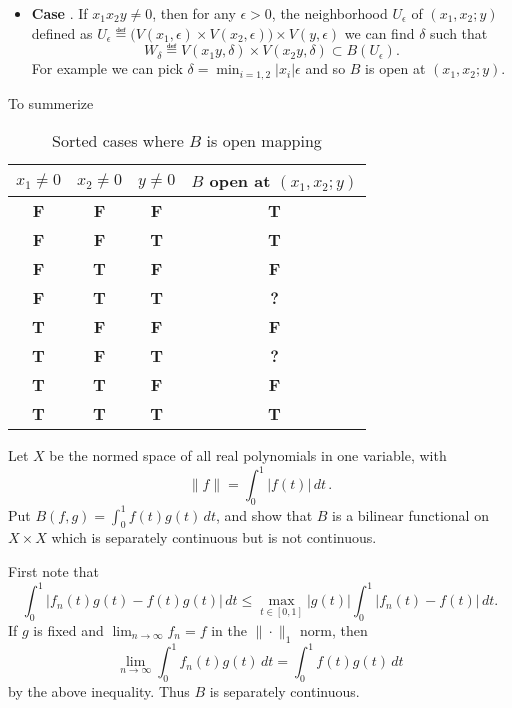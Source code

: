 \begin{enumerate}
\begin{itemize}
\item \textbf{Case} .
If \(x_1 x_2 y \neq 0\), then for any \(\epsilon>0\), 
the neighborhood \(U_\epsilon\) of
\((x_1,x_2;y)\) defined as 
\(U_\epsilon 
  \eqdef \bigl(V(x_1,\epsilon) \times  V(x_2,\epsilon)\bigr) 
         \times V(y,\epsilon)\)
we can find \(\delta\) such that 
\begin{equation*}
 W_\delta \eqdef V(x_1y,\delta) \times V(x_2y,\delta) \subset B(U_\epsilon).
\end{equation*}
For example we can pick
\(\delta = \min_{i=1,2} |x_i|\epsilon\)
and so $B$ is open at \((x_1,x_2;y)\).

\end{itemize}

To summerize
\begin{table}[ht] \label{tbl:B:open}
\begin{center}
\newcommand{\bfsf}{\bfseries\sffamily}
\begin{tabular}{|>{\bfsf}c|>{\bfsf}c|>{\bfsf}c|>{\bfseries}c|}
\hline
 \(x_1\neq 0\) &  \(x_2\neq 0\)  & \(y\neq 0\) & $B$ open at \((x_1,x_2;y)\) \\
\hline
  F & F & F & T \\ \hline
  F & F & T & T \\ \hline
  F & T & F & F \\ \hline
  F & T & T & ? \\ \hline
  T & F & F & F \\ \hline
  T & F & T & ? \\ \hline
  T & T & F & F \\ \hline
  T & T & T & T \\ \hline
\end{tabular}
\caption{Sorted cases where $B$ is open mapping}
\end{center}
\end{table}


\begin{excopy}
Let $X$ be the normed space of all real polynomials in one variable, with
\begin{equation*}
 \|f\| = \int_0^1 |f(t)|\,dt\,.
\end{equation*}
Put \(B(f,g) = \int_0^1f(t)g(t)\,dt\),
and show that $B$ is a bilinear functional on \(X\times X\)
which is separately continuous but is not continuous.
\end{excopy}

First note that
\begin{equation*}
  \int_0^1 |f_n(t)g(t) - f(t)g(t)|\,dt
 \leq \max_{t\in[0,1]}|g(t)| \int_0^1 |f_n(t) - f(t)|\,dt.
\end{equation*}
If $g$ is fixed and \(\lim_{n\to\infty} f_n = f\) in the \(\|\cdot\|_1\) norm,
then 
\begin{equation*}
\lim_{n\to\infty} \int_0^1 f_n(t)g(t)\,dt = \int_0^1 f(t)g(t)\,dt 
\end{equation*}
by the above inequality. Thus $B$ is separately continuous.


\end{enumerate}
